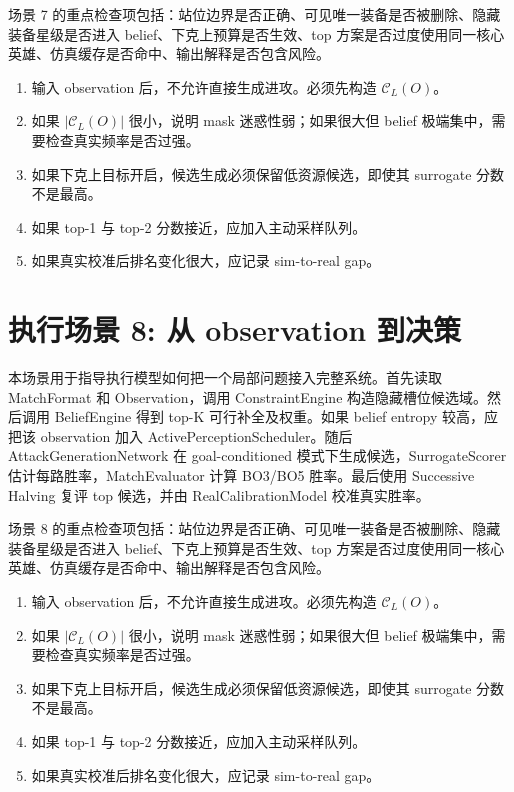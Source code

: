 \documentclass[UTF8,12pt,openany]{ctexbook}
\newcommand{\Ccal}{\mathcal{C}}
\begin{document}
场景 7 的重点检查项包括：站位边界是否正确、可见唯一装备是否被删除、隐藏装备星级是否进入 belief、下克上预算是否生效、top 方案是否过度使用同一核心英雄、仿真缓存是否命中、输出解释是否包含风险。

\begin{enumerate}[leftmargin=2em]
\item 输入 observation 后，不允许直接生成进攻。必须先构造 $\Ccal_L(O)$。
\item 如果 $|\Ccal_L(O)|$ 很小，说明 mask 迷惑性弱；如果很大但 belief 极端集中，需要检查真实频率是否过强。
\item 如果下克上目标开启，候选生成必须保留低资源候选，即使其 surrogate 分数不是最高。
\item 如果 top-1 与 top-2 分数接近，应加入主动采样队列。
\item 如果真实校准后排名变化很大，应记录 sim-to-real gap。
\end{enumerate}


\section{执行场景 8: 从 observation 到决策}
本场景用于指导执行模型如何把一个局部问题接入完整系统。首先读取 MatchFormat 和 Observation，调用 ConstraintEngine 构造隐藏槽位候选域。然后调用 BeliefEngine 得到 top-K 可行补全及权重。如果 belief entropy 较高，应把该 observation 加入 ActivePerceptionScheduler。随后 AttackGenerationNetwork 在 goal-conditioned 模式下生成候选，SurrogateScorer 估计每路胜率，MatchEvaluator 计算 BO3/BO5 胜率。最后使用 Successive Halving 复评 top 候选，并由 RealCalibrationModel 校准真实胜率。

场景 8 的重点检查项包括：站位边界是否正确、可见唯一装备是否被删除、隐藏装备星级是否进入 belief、下克上预算是否生效、top 方案是否过度使用同一核心英雄、仿真缓存是否命中、输出解释是否包含风险。

\begin{enumerate}[leftmargin=2em]
\item 输入 observation 后，不允许直接生成进攻。必须先构造 $\Ccal_L(O)$。
\item 如果 $|\Ccal_L(O)|$ 很小，说明 mask 迷惑性弱；如果很大但 belief 极端集中，需要检查真实频率是否过强。
\item 如果下克上目标开启，候选生成必须保留低资源候选，即使其 surrogate 分数不是最高。
\item 如果 top-1 与 top-2 分数接近，应加入主动采样队列。
\item 如果真实校准后排名变化很大，应记录 sim-to-real gap。
\end{enumerate}
\end{document}
